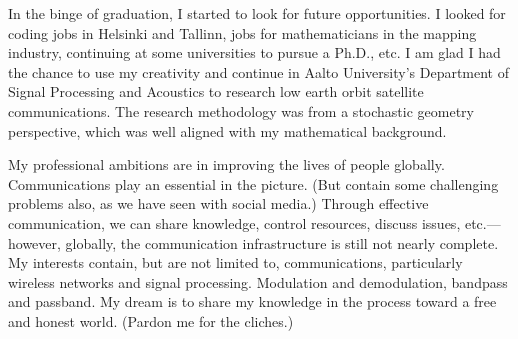 \documentclass{article}
\begin{document}
{          In the binge of graduation, I started to look for future opportunities. I looked for coding jobs in Helsinki and Tallinn, jobs for mathematicians in the mapping industry, continuing at some universities to pursue a Ph.D., etc. I am glad I had the chance to use my creativity and continue in Aalto University's Department of Signal Processing and Acoustics to research low earth orbit satellite communications. The research methodology was from a stochastic geometry perspective, which was well aligned with my mathematical background.

          My professional ambitions are in improving the lives of people globally. Communications play an essential in the picture. (But contain some challenging problems also, as we have seen with social media.) Through effective communication, we can share knowledge, control resources, discuss issues, etc.---however, globally, the communication infrastructure is still not nearly complete. My interests contain, but are not limited to, communications, particularly wireless networks and signal processing. Modulation and demodulation, bandpass and passband. My dream is to share my knowledge in the process toward a free and honest world. (Pardon me for the cliches.)
          
        }

\end{document}
